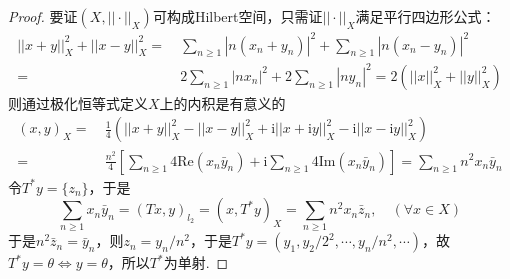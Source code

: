 \documentclass[12pt, a4paper, oneside]{ctexart}
\let\geq=\geqslant %
\def\i{\mathrm{i}}          %
\def\re{\mathrm{Re}}        %
\def\im{\mathrm{Im}}        %
\begin{document}
\begin{proof}
    要证$(X,||\cdot||_X)$可构成Hilbert空间，只需证$||\cdot||_X$满足平行四边形公式：
    \begin{align*}
        ||x+y||_X^2+||x-y||_X^2=&\ \sum_{n\geq 1}|n(x_n+y_n)|^2+\sum_{n\geq 1}|n(x_n-y_n)|^2\\
        =&\ 2\sum_{n\geq 1}|nx_n|^2+2\sum_{n\geq 1}|ny_n|^2 = 2(||x||_X^2+||y||_X^2)
    \end{align*}
    则通过极化恒等式定义$X$上的内积是有意义的
    \begin{align*}
        (x,y)_X =&\ \frac{1}{4}\left(||x+y||_X^2-||x-y||_X^2+\i||x+\i y||_X^2-\i||x-\i y||_X^2\right)\\
        =&\ \frac{n^2}{4}\left[\sum_{n\geq 1}4\re(x_n\bar{y}_n)+\i\sum_{n\geq 1}4\im(x_n\bar{y}_n)\right] = \sum_{n\geq 1}n^2x_n\bar{y}_n
    \end{align*}
    令$T^*y = \{z_n\}$，于是
    \begin{equation*}
        \sum_{n\geq 1}x_n\bar{y}_n = (Tx,y)_{l_2} = (x,T^*y)_X = \sum_{n\geq 1}n^2x_n\bar{z}_n,\quad(\forall x\in X)
    \end{equation*}
    于是$n^2\bar{z}_n = \bar{y}_n$，则$z_n=y_n/n^2$，于是$T^*y = (y_1,y_2/2^2,\cdots, y_n/n^2,\cdots)$，故$T^*y = \theta\iff y=\theta$，所以$T^*$为单射.
\end{proof}
\end{document}

